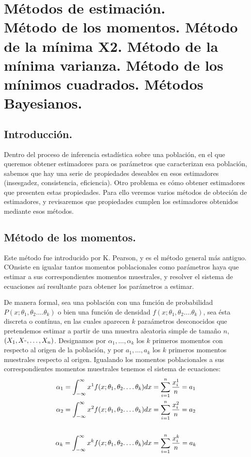 \chapter[M\'etodos de estimaci\'on.]{M\'etodos de estimaci\'on.  \\
\normalsize M\'etodo de los momentos. M\'etodo de la m\'inima X2. M\'etodo de la m\'inima varianza. M\'etodo de los m\'inimos cuadrados. M\'etodos Bayesianos.}

\section{Introducci\'on.}

Dentro del proceso de inferencia estad\'istica sobre una poblaci\'on, en el que queremos obtener estimadores para os par\'ametros que caracterizan esa poblaci\'on, sabemos que hay una serie de propiedades deseables en esos estimadores (insesgadez, consistencia, eficiencia). Otro problema es c\'omo obtener estimadores que presenten estas propiedades. Para ello veremos varios m\'etodos de obteci\'on de estimadores, y revisaremos que propiedades cumplen los estimadores obtenidos mediante esos m\'etodos.

\section{M\'etodo de los momentos.}

Este m\'etodo fue introducido por K. Pearson, y es el m\'etodo general m\'as antiguo. COnsiste en igualar tantos momentos poblacionales como par\'ametros haya que estimar a sus correspondientes momentos muestrales, y resolver el sistema de ecuaciones as\'i resultante para obtener los par\'ametros a estimar.

De manera formal, sea una poblaci\'on con una funci\'on de probabilidad $P(x;\theta_1,\theta_2.\ldots\theta_k)$ o bien una funci\'on de densidad $f(x;\theta_1,\theta_2.\ldots\theta_k)$, sea \'esta discreta o cont\'inua, en las cuales aparecen $k$ para\'ametros desconocidos que pretendemos estimar a partir de una muestra aleatoria simple de tama\~no $n$, $(X_1,X_",\ldots,X_n)$. Designamos por $\alpha_1,\ldots,\alpha_k$ los $k$ primeros momentos con respecto al origen de la poblaci\'on, y por $a_1,\ldots,a_k$ los $k$ primeros momentos muestrales respecto al origen. Igualando los momentos poblacionales a sus correspondientes momentos muestrales tenemos el sistema de ecuaciones:
\begin{align*}
\alpha_1=\int_{-\infty}^{\infty}x^1f(x;\theta_1,\theta_2.\ldots\theta_k)dx&=\sum_{i=1}^{n}\dfrac{x_i^1}{n}=a_1 \\
\alpha_2=\int_{-\infty}^{\infty}x^2f(x;\theta_1,\theta_2.\ldots\theta_k)dx&=\sum_{i=1}^{n}\dfrac{x_i^2}{n}=a_2 \\
\dotfill & \dotfill \\
\alpha_k=\int_{-\infty}^{\infty}x^kf(x;\theta_1,\theta_2.\ldots\theta_k)dx&=\sum_{i=1}^{n}\dfrac{x_i^k}{n}=a_k 
\end{align*}

